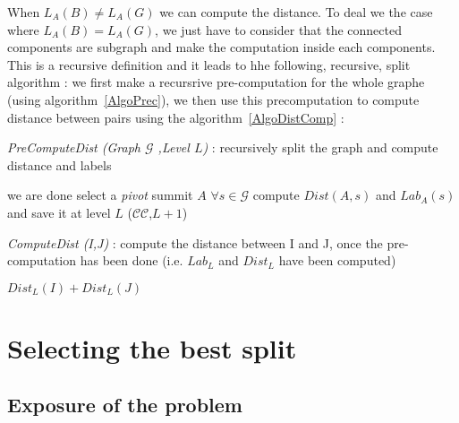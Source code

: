 \documentclass[a4paper]{article}
\begin{document}
When $L_A(B) \neq L_A(G)$ we can compute the distance. To deal we the case where 
$L_A(B) = L_A(G)$, we just have to consider that the connected components are subgraph
and make the computation inside each components. This is a recursive definition
and it leads to hhe following, recursive, split algorithm  : we first
make a recursrive pre-computation for the whole graphe (using algorithm~\ref{AlgoPrec}),
we then use this precomputation  to compute distance between pairs using the 
algorithm~\ref{AlgoDistComp} :

\begin{algorithm}
\caption{{\it PreComputeDist (Graph $\mathcal{G}$ ,Level  $L$)} : recursively split the graph and compute distance and labels } 
\begin{algorithmic}
       \STATE we are done
    \ELSE
        \STATE select a \emph{pivot} summit $A$ 
        \STATE $\forall s\in \mathcal{G}$ compute $Dist(A,s)$ and $Lab_A(s) $ and save it at level $L$
               ($\mathcal{CC}$,$L+1$)
        \ENDFOR
    \ENDIF
\end{algorithmic}
\label{AlgoPrec}
\end{algorithm}


\begin{algorithm}
\caption{{\it ComputeDist (I,J)} : compute the distance between I and J, once the pre-computation has been done (i.e. $Lab_L$ and $Dist_L$ have been computed)}
\begin{algorithmic}
       \STATE {}
    \ELSE
              \STATE \RETURN $Dist_L(I) + Dist_L(J)$
             \ENDIF
        \ENDFOR
    \ENDIF
\end{algorithmic}
\label{AlgoDistComp}
\end{algorithm}


\section{Selecting the best split}

\subsection{Exposure of the problem}
\label{SubSel}
\end{document}
